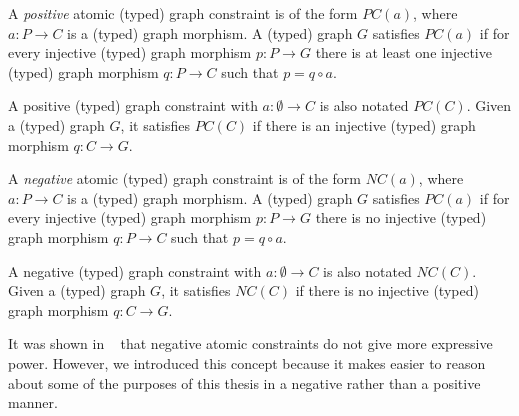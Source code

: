 \begin{definition} A \emph{positive} atomic (typed) graph constraint is of the form $PC\left(a\right)$, where $a : P \rightarrow C$ is a (typed) graph morphism. A (typed) graph $G$ satisfies $PC\left(a\right)$ if for every injective (typed) graph morphism $p : P \rightarrow G$ there is at least one injective (typed) graph morphism $q : P \rightarrow C$ such that $p = q \circ a$.

  A positive (typed) graph constraint with $a : \emptyset \rightarrow C$ is also notated $PC\left(C\right)$. Given a (typed) graph $G$, it satisfies $PC\left(C\right)$ if there is an injective (typed) graph morphism $q : C \rightarrow  G$.


\end{definition}

\begin{definition}
A \emph{negative} atomic (typed) graph constraint is of the form $NC\left(a\right)$, where $a : P \rightarrow C$ is a (typed) graph morphism. A (typed) graph $G$ satisfies $PC\left(a\right)$ if for every injective (typed) graph morphism $p : P \rightarrow G$ there is no injective (typed) graph morphism $q : P \rightarrow C$ such that $p = q \circ a$.

  A negative (typed) graph constraint with $a : \emptyset \rightarrow C$ is also notated $NC\left(C\right)$. Given a (typed) graph $G$, it satisfies $NC\left(C\right)$ if there is no injective (typed) graph morphism $q : C \rightarrow G$.


\end{definition}

\begin{remark} It was shown in ~\cite{Ehrig2006} that negative atomic constraints do not give more expressive power. However, we introduced this concept because it makes easier to reason about some of the purposes of this thesis in a negative rather than a positive manner.
\end{remark}


